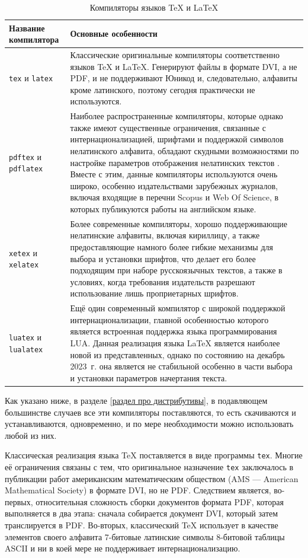 \documentclass[workbook]{fefudoc}
\begin{document}
\begin{table}[ht]\small
\centering
\caption{Компиляторы языков \TeX{} и \LaTeX{}}
\label{таблица компиляторов}
\begin{tabularx}{\textwidth}{|l|X|}
\hline
\textbf{Название компилятора} & \textbf{Основные особенности} \\ \hline
\texttt{tex} и \texttt{latex} & Классические оригинальные компиляторы соответственно языков \TeX{} и \LaTeX{}. Генерируют файлы в формате DVI, а не PDF, и не поддерживают Юникод и, следовательно, алфавиты кроме латинского, поэтому сегодня практически не используются. \\ \hline
\texttt{pdftex} и \texttt{pdflatex} & Наиболее распространенные компиляторы, которые однако также имеют существенные ограничения, связанные с интернационализацией, шрифтами и поддержкой символов нелатинского алфавита, обладают скудными возможностями по настройке параметров отображения нелатинских текстов \cite{ПособиеLatex}. Вместе с этим, данные компиляторы используются очень широко, особенно издательствами зарубежных журналов, включая входящие в перечни Scopus и Web Of Science, в которых публикуются работы на английском языке. \\ \hline
\texttt{xetex} и \texttt{xelatex} & Более современные компиляторы, хорошо поддерживающие нелатинские алфавиты, включая кириллицу, а также предоставляющие намного более гибкие механизмы для выбора и установки шрифтов, что делает его более подходящим при наборе русскоязычных текстов, а также в условиях, когда требования издательств разрешают использование лишь проприетарных шрифтов. \\ \hline
\texttt{luatex} и \texttt{lualatex} & Ещё один современный компилятор с широкой поддержкой интернационализации, главной особенностью которого является встроенная поддержка языка программирования LUA. Данная реализация языка \LaTeX{} является наиболее новой из представленных, однако по состоянию на декабрь 2023~г. она является не стабильной особенно в части выбора и установки параметров начертания текста.\\ \hline
\end{tabularx}
\end{table}

Как указано ниже, в разделе \ref{раздел про дистрибутивы}, в подавляющем большинстве случаев все эти компиляторы поставляются, то есть скачиваются и устанавливаются, одновременно, и по мере необходимости можно использовать любой из них.

Классическая реализация языка \TeX{} поставляется в виде программы \texttt{tex}.
Многие её ограничения связаны с тем, что оригинальное назначение \texttt{tex} заключалось в публикации работ американским математическим обществом (AMS --- American Mathematical Society) в формате DVI, но не PDF.
Следствием является, во-первых, относительная сложность сборки документов формата PDF, которая выполняется в два этапа: сначала собирается документ DVI, который затем транслируется в PDF.
Во-вторых, классический \TeX{} использует в качестве элементов своего алфавита 7-битовые латинские символы 8-битовой таблицы ASCII и ни в коей мере не поддерживает интернационализацию.
\end{document}
